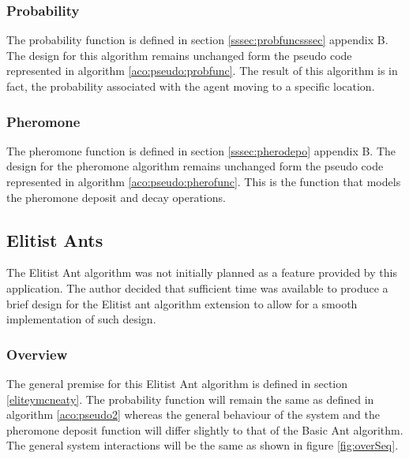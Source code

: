 \subsubsection{Probability}

The probability function is defined in section \ref{sssec:probfuncsssec} appendix B. The design for this algorithm remains unchanged form the pseudo code represented in algorithm \ref{aco:pseudo:probfunc}. The result of this algorithm is in fact, the probability associated with the agent moving to a specific location.

\subsubsection{Pheromone}

The pheromone function is defined in section \ref{sssec:pherodepo} appendix B. The design for the pheromone algorithm remains unchanged form the pseudo code represented in algorithm \ref{aco:pseudo:pherofunc}. This is the function that models the pheromone deposit and decay operations.

\subsection{Elitist Ants}

The Elitist Ant algorithm was not initially planned as a feature provided by this application. The author decided that sufficient time was available to produce a brief design for the Elitist ant algorithm extension to allow for a smooth implementation of such design.

\subsubsection{Overview}

The general premise for this Elitist Ant algorithm is defined in section \ref{eliteymcneaty}. The probability function will remain the same as defined in algorithm \ref{aco:pseudo2} whereas the general behaviour of the system and the pheromone deposit function will differ slightly to that of the Basic Ant algorithm. The general system interactions will be the same as shown in figure \ref{fig:overSeq}.


